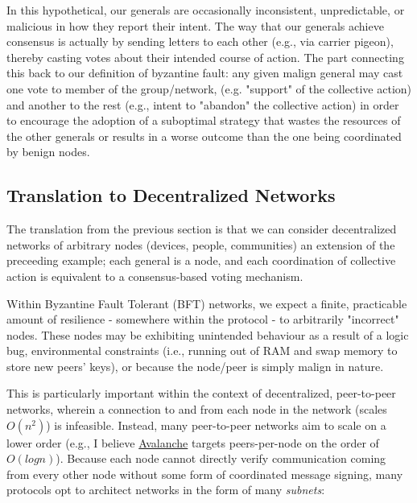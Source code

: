 In this hypothetical, our generals are occasionally inconsistent, unpredictable, or malicious in how they report their intent. The way that our generals achieve consensus is actually by sending letters to each other (e.g., via carrier pigeon), thereby casting votes about their intended course of action. The part connecting this back to our definition of byzantine fault: any given malign general may cast one vote to member of the group/network, (e.g. "support" of the collective action) and another to the rest (e.g., intent to "abandon" the collective action) in order to encourage the adoption of a suboptimal strategy that wastes the resources of the other generals or results in a worse outcome than the one being coordinated by benign nodes.

\subsection{Translation to Decentralized Networks}

The translation from the previous section is that we can consider decentralized networks of arbitrary nodes (devices, people, communities) an extension of the preceeding example; each general is a node, and each coordination of collective action is equivalent to a consensus-based voting mechanism.

Within Byzantine Fault Tolerant (BFT) networks, we expect a finite, practicable amount of resilience - somewhere within the protocol - to arbitrarily "incorrect" nodes.
         	These nodes may be exhibiting unintended behaviour as a result of a logic bug, environmental constraints (i.e., running out of RAM and swap memory to store new peers' keys), or because the node/peer is simply malign in nature.

This is particularly important within the context of decentralized, peer-to-peer networks, wherein a connection to and from each node in the network (scales $O(n^2)$) is infeasible.
         	Instead, many peer-to-peer networks aim to scale on a lower order (e.g., I believe \href{https://www.avax.network/}{Avalanche} targets peers-per-node on the order of $O(log n)$).
          	Because each node cannot directly verify communication coming from every other node without some form of coordinated message signing, many protocols opt to architect networks in the form of many \emph{subnets}:

